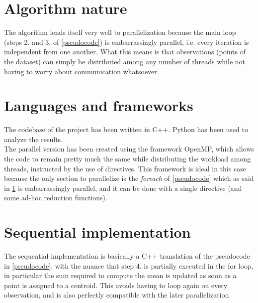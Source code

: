 \documentclass[10pt,twocolumn,letterpaper]{article}
\begin{document}
\section{Algorithm nature} \label{nature}
The algorithm lends itself very well to parallelization because the main loop (steps 2. and 3. of \cref{pseudocode}) is embarrassingly parallel, i.e. every iteration is independent from one another. What this means is that observations (points of the dataset) can simply be distributed among any number of threads while not having to worry about communication whatsoever.

\section{Languages and frameworks}
The codebase of the project has been written in C++. Python has been used to analyze the results.\\
The parallel version has been created using the framework OpenMP, which allows the code to remain pretty much the same while distributing the workload among threads, instructed by the use of directives. This framework is ideal in this case because the only section to parallelize is the \textit{foreach} of \cref{pseudocode} which as said in \cref{nature} is embarrassingly parallel, and it can be done with a single directive (and some ad-hoc reduction functions).

\section{Sequential implementation} \label{seq_imp}
The sequential implementation is basically a C++ translation of the pseudocode in \cref{pseudocode}, with the nuance that step 4. is partially executed in the for loop, in particular the sum required to compute the mean is updated as soon as a point is assigned to a centroid. This avoids having to loop again on every observation, and is also perfectly compatible with the later parallelization.
\end{document}
